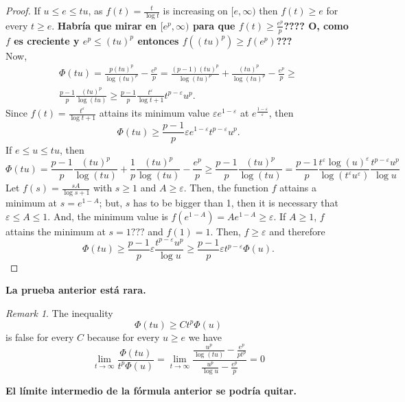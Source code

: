 \documentclass[twoside]{article}
\theoremstyle{remark}
\newtheorem{comentario}{Remark}
\renewcommand{\leq}{\leqslant}
\begin{document}
\begin{proof}
If $u\leq e\leq tu$, as $f(t)=\frac{t}{\log t}$ is increasing on $[e,\infty)$ then $f(t)\geq e$ for every $t\geq e$. 
{\bf Habr\'ia que mirar en $[e^p,\infty)$ para que $f(t)\geq \frac{e^p}{p}$???? O, como $f$ es creciente y 
$e^p\leq (tu)^p$ entonces
$f((tu)^p)\geq f(e^p)$???}
\\
Now, 
\[
\begin{split}
\Phi(tu)=\frac{p(tu)^p}{\log (tu)^p}-\frac{e^p}{p}=
\frac{(p-1)(tu)^p}{\log(tu)^p}+\frac{(tu)^p}{\log (tu)^p}-\frac{e^p}{p}\geq 
\\
\frac{p-1}{p}\frac{(tu)^p}{\log(tu)}\geq
\frac{p-1}{p}\frac{t^{\varepsilon}}{\log t+1}t^{p-\varepsilon}u^p.
\end{split}
\]
Since $f(t)=\frac{t^{\varepsilon}}{\log t+1}$ attains its 
 minimum value $\varepsilon e^{1-\varepsilon}$ at 
$e^{\frac{1-\varepsilon}{\varepsilon}}$, \; then  
\[
\Phi(tu)\geq \frac{p-1}{p}\varepsilon e^{1-\varepsilon}t^{p-\varepsilon}u^p.
\]
If $e\leq u\leq tu$, then 
\[
\Phi(tu)=\frac{p-1}{p}\frac{(tu)^p}{\log(tu)}
+\frac{1}{p}\frac{(tu)^p}{\log(tu)}-\frac{e^p}{p}
\geq
\frac{p-1}{p}\frac{(tu)^p}{\log(tu)}=
\frac{p-1}{p}
\frac{t^{\varepsilon} \log (u)^{\varepsilon}}{\log(t^{\varepsilon}u^{\varepsilon})}
\frac{t^{p-\varepsilon}u^p}{\log u}
\]
Let $f(s)=\frac{sA}{\log s+1}$ with $s\geq 1$ and $A\geq \varepsilon$.
Then, the function $f$ attains a minimum at $s=e^{1-A}$; but, 
$s$ has to be bigger than 1, then it is necessary that
$\varepsilon\leq A\leq 1$.
And, the minimum value is $f(e^{1-A})=Ae^{1-A}\geq \varepsilon$.
If $A\geq 1$, $f$ attains the minimum at $s=1???$ and $f(1)=1$. 
Then, $f\geq \varepsilon$ and  therefore
\[
\Phi(tu)\geq \frac{p-1}{p}\varepsilon \frac{t^{p-\varepsilon}u^p}{\log u}\geq
\frac{p-1}{p}\varepsilon t^{p-\varepsilon}\Phi(u).
\]
\end{proof}

{\bf La prueba anterior est\'a rara.}





\begin{comentario}
The inequality 
\[
\Phi(tu)\geq Ct^p\Phi(u)
\] 
is false for every $C$ because for every $u\geq e$ we have 
\[
\lim\limits_{t \to \infty}\frac{\Phi(tu)}{t^p\Phi(u)}=
\lim\limits_{t \to \infty} \frac{\frac{u^p}{\log(tu)}-
\frac{e^p}{pt^p}}{\frac{u^p}{\log u}-\frac{e^p}{p}}=0
\]
\end{comentario}



{\bf El l\'imite intermedio de la f\'ormula anterior se podr\'ia quitar.}
\end{document}
